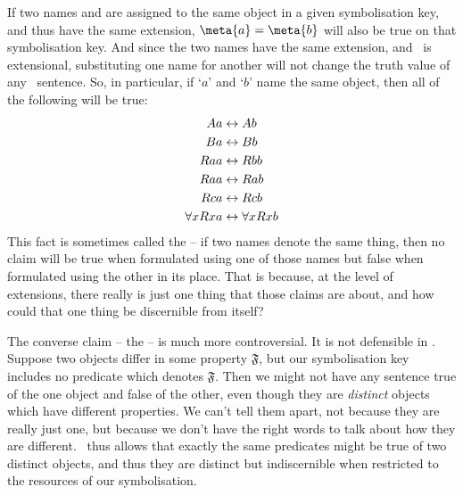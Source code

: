 If two names  and  are assigned to the same object in a given symbolisation key, and thus have the same extension, $\meta{a}=\meta{b}$ will also be true  on that symbolisation key. And since the two names have the same extension, and \FOL\ is extensional, substituting one name for another will not change the truth value of any \FOL\ sentence. So, in particular, if `$a$' and `$b$' name the same object, then all of the following will be true:\label{model.nonidentity}
	\begin{align*}
	 	Aa &\leftrightarrow Ab \\
	 	Ba &\leftrightarrow Bb\\
		Raa &\leftrightarrow Rbb\\
		Raa & \leftrightarrow Rab\\
		Rca &\leftrightarrow Rcb\\
		\forall x Rxa &\leftrightarrow \forall x Rxb
	\end{align*}
This fact is sometimes called the  – if two names denote the same thing, then no claim will be true when formulated using one of those names but false when formulated using the other in its place. That is because, at the level of extensions, there really is just one thing that those claims are about, and how could that one thing be discernible from itself?

The converse claim – the  – is much more controversial. It is not defensible in \FOL. Suppose two objects differ in some property $\mathfrak{F}$, but our symbolisation key includes no predicate which denotes $\mathfrak{F}$. Then we might not have any sentence true of the one object and false of the other, even though they are \emph{distinct} objects which have different properties. We can't tell them apart, not because they are really just one, but because we don't have the right words to talk about how they are different. \FOL\ thus allows that exactly the same predicates might be true of two distinct objects, and thus they are distinct but indiscernible when restricted to the resources of our symbolisation.




